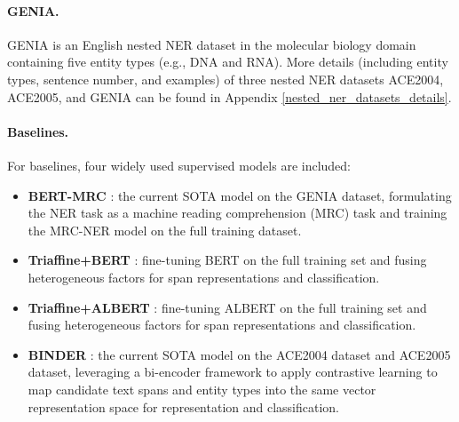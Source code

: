 \documentclass[11pt]{article}
\begin{document}
\paragraph{GENIA.}
GENIA \cite{ohta2002genia} is an English nested NER dataset in the molecular biology domain containing five entity types (e.g., DNA and RNA).
More details (including entity types, sentence number, and examples) of three nested NER datasets ACE2004, ACE2005, and GENIA can be found in Appendix \ref{nested_ner_datasets_details}.

\paragraph{Baselines.} For baselines, four widely used supervised models are included:
\begin{itemize}
	\item \textbf{BERT-MRC} \citep{li2019unified}: the current SOTA model on the GENIA dataset, formulating the NER task as a machine reading comprehension (MRC) task and training the MRC-NER model on the full training dataset.
	\item \textbf{Triaffine+BERT} \citep{yuan2021fusing}: fine-tuning BERT \cite{devlin2018bert} on the full training set and fusing heterogeneous factors for span representations and classification.
	\item \textbf{Triaffine+ALBERT} \citep{yuan2021fusing}: fine-tuning ALBERT \cite{lan2019albert} on the full training set and fusing heterogeneous factors for span representations and classification.
	\item \textbf{BINDER} \citep{zhang2022optimizing}: the current SOTA model on the ACE2004 dataset and ACE2005 dataset, leveraging a bi-encoder framework to apply contrastive learning to map candidate text spans and entity types into the same vector representation space for representation and classification.
\end{itemize}
\end{document}
